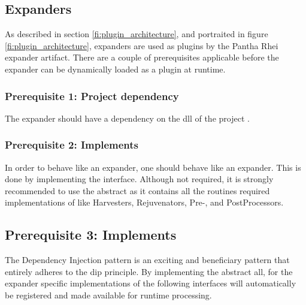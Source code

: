 \subsection{Expanders} \label{subsec:expanders}

As described in section \ref{fi:plugin_architecture}, and portraited in figure
\ref{fi:plugin_architecture}, expanders are used as plugins by the Pantha Rhei expander
artifact. There are a couple of prerequisites applicable before the expander can be
dynamically loaded as a plugin at runtime.

\subsubsection*{Prerequisite 1: Project dependency}
The expander should have a dependency on the \gls{dll} of the project
.

\subsubsection*{Prerequisite 2: Implements } In order
to behave like an expander, one should behave like an expander. This is done by
implementing the  interface. Although not
required, it is strongly recommended to use the abstract
 as it contains all the routines required
implementations of  like Harvesters,
Rejuvenators, Pre-, and PostProcessors.

\subsection*{Prerequisite 3: Implements
}
The Dependency Injection pattern is an exciting and beneficiary pattern that entirely 
adheres to the \gls{dip} principle. By implementing the abstract
 all, for the expander
specific implementations of the following interfaces will automatically be registered and
made available for runtime processing.

